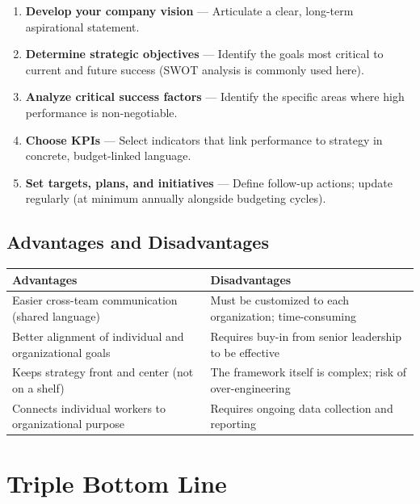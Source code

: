 \documentclass[11pt, letterpaper]{article}
\begin{document}
\begin{enumerate}[leftmargin=*, label=\textbf{Step \arabic*.}]
  \item \textbf{Develop your company vision} --- Articulate a clear, long-term aspirational statement.
  \item \textbf{Determine strategic objectives} --- Identify the goals most critical to current and future success (SWOT analysis is commonly used here).
  \item \textbf{Analyze critical success factors} --- Identify the specific areas where high performance is non-negotiable.
  \item \textbf{Choose KPIs} --- Select indicators that link performance to strategy in concrete, budget-linked language.
  \item \textbf{Set targets, plans, and initiatives} --- Define follow-up actions; update regularly (at minimum annually alongside budgeting cycles).
\end{enumerate}

\subsection{Advantages and Disadvantages}

\begin{center}
\begin{tabular}{p{6.5cm} p{6.5cm}}
\toprule
\textbf{Advantages} & \textbf{Disadvantages} \\
\midrule
Easier cross-team communication (shared language) & Must be customized to each organization; time-consuming \\
Better alignment of individual and organizational goals & Requires buy-in from senior leadership to be effective \\
Keeps strategy front and center (not on a shelf) & The framework itself is complex; risk of over-engineering \\
Connects individual workers to organizational purpose & Requires ongoing data collection and reporting \\
\bottomrule
\end{tabular}
\end{center}

\newpage

\section{Triple Bottom Line}
\end{document}
